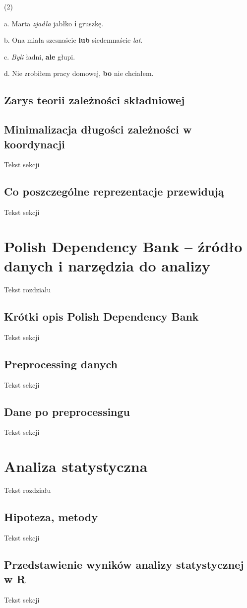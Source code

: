 \documentclass[licencjacka]{pracamgr_Kogni}
\begin{document}
(2)

a. Marta \textit{zjadła} jabłko \textbf{i} gruszkę.

b. Ona miała szesnaście \textbf{lub} siedemnaście \textit{lat}.

c. \textit{Byli} ładni, \textbf{ale} głupi.

d. Nie zrobiłem pracy domowej, \textbf{bo} nie chciałem.

\section{Zarys teorii zależności składniowej}


\section{Minimalizacja długości zależności w koordynacji}
Tekst sekcji
\section{Co poszczególne reprezentacje przewidują}
Tekst sekcji

\chapter{Polish Dependency Bank -- źródło danych i narzędzia do analizy}
Tekst rozdziału
\section{Krótki opis Polish Dependency Bank}
Tekst sekcji
\section{Preprocessing danych}
Tekst sekcji
\section{Dane po preprocessingu}
Tekst sekcji

\chapter{Analiza statystyczna}
Tekst rozdziału
\section{Hipoteza, metody}
Tekst sekcji
\section{Przedstawienie wyników analizy statystycznej w R}
Tekst sekcji
\end{document}
